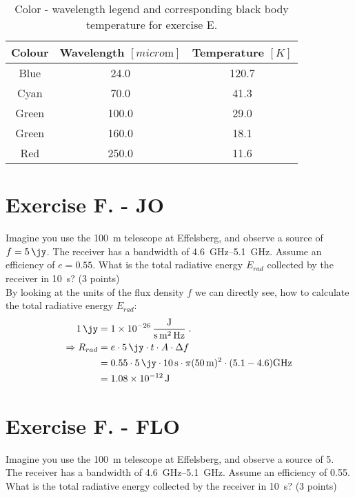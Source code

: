 \documentclass[11pt,a4paper,twoside]{article}
\begin{document}
\begin{table}[h!]
\centering
\begin{tabular}{ccc}\toprule
Colour  & Wavelength $[\si{micro\meter}]$  & Temperature $[K]$  \\ \midrule
Blue    & 24.0  & 120.7                \\
Cyan    & 70.0  & 41.3                \\
Green   & 100.0 & 29.0                \\
Green   & 160.0 & 18.1                \\
Red     & 250.0 & 11.6               \\
\bottomrule
\end{tabular}
\caption{Color - wavelength legend and corresponding black body temperature for
         exercise E.}
\label{tab:col}
\end{table}


\section*{Exercise F. - JO}

Imagine you use the \SI{100}{\meter} telescope at Effelsberg, and observe a
source of $f = \SI{5}{\jy}$. The receiver has a bandwidth of
\SIrange{4.6}{5.1}{\giga\hertz}. Assume an efficiency of $e=0.55$.  What is the
total radiative energy $E_{rad}$ collected by the receiver in \SI{10}{\second}? (3
points) \\

By looking at the units of the flux density $f$ we can directly see, how to 
calculate the total radiative energy $E_{rad}$:
\begin{align}
\SI{1}{\jy} &= \SI[per-mode=fraction]{1e-26}{\joule\per\second\per\meter\squared\per\hertz}\;. \\
\Rightarrow
R_{rad} &= e \cdot \SI{5}{\jy} \cdot t \cdot A \cdot \Delta f \\
&= 0.55 \cdot \SI{5}{\jy} \cdot \SI{10}{\second} \cdot \pi(\SI{50}{\meter})^2 \cdot (5.1-4.6)\si{\giga\hertz} \\
&= \SI{1.08e-12}{\joule}
\end{align}


\section*{Exercise F. - FLO} 

Imagine you use the \SI{100}{\metre} telescope at Effelsberg, and observe a
source of \SI{5}{\jansky}. The receiver has a bandwidth of
\SIrange{4.6}{5.1}{\GHz}. Assume an efficiency of \num{0.55}. What is the total
radiative energy collected by the receiver in \SI{10}{\second}? (3 points) \\
\end{document}

